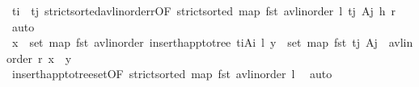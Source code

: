 \begin{isabellebody}
\ {\isacartoucheopen}t\isactrlsub i\ {\isacharless}{\kern0pt}\ t\isactrlsub j{\isacartoucheclose}\ strict{\isacharunderscore}{\kern0pt}sorted{\isacharunderscore}{\kern0pt}avl{\isacharunderscore}{\kern0pt}inorder{\isacharunderscore}{\kern0pt}r{\isacharbrackleft}{\kern0pt}OF\ {\isacartoucheopen}strict{\isacharunderscore}{\kern0pt}sorted\ {\isacharparenleft}{\kern0pt}map\ fst\ {\isacharparenleft}{\kern0pt}avl{\isacharunderscore}{\kern0pt}inorder\ {\isasymlangle}l{\isacharcomma}{\kern0pt}\ {\isacharparenleft}{\kern0pt}{\isacharparenleft}{\kern0pt}t\isactrlsub j{\isacharcomma}{\kern0pt}\ A\isactrlsub j{\isacharparenright}{\kern0pt}{\isacharcomma}{\kern0pt}\ h{\isacharparenright}{\kern0pt}{\isacharcomma}{\kern0pt}\ r{\isasymrangle}{\isacharparenright}{\kern0pt}{\isacharparenright}{\kern0pt}{\isacartoucheclose}{\isacharbrackright}{\kern0pt}\ \isamarkupfalse%
\ auto\isanewline
\ \ \ \ \ \ \isamarkupfalse%
\ \isamarkupfalse%
\ {\isachardoublequoteopen}{\isasymforall}x\ {\isasymin}\ set\ {\isacharparenleft}{\kern0pt}map\ fst\ {\isacharparenleft}{\kern0pt}avl{\isacharunderscore}{\kern0pt}inorder\ {\isacharparenleft}{\kern0pt}insert{\isacharunderscore}{\kern0pt}happ{\isacharunderscore}{\kern0pt}to{\isacharunderscore}{\kern0pt}tree\ {\isacharparenleft}{\kern0pt}t\isactrlsub i{\isacharcomma}{\kern0pt}A\isactrlsub i{\isacharparenright}{\kern0pt}\ l{\isacharparenright}{\kern0pt}{\isacharparenright}{\kern0pt}{\isacharparenright}{\kern0pt}{\isachardot}{\kern0pt}\ {\isasymforall}y\ {\isasymin}\ set\ {\isacharparenleft}{\kern0pt}map\ fst\ {\isacharparenleft}{\kern0pt}{\isacharparenleft}{\kern0pt}t\isactrlsub j{\isacharcomma}{\kern0pt}\ A\isactrlsub j{\isacharparenright}{\kern0pt}\ {\isacharhash}{\kern0pt}\ avl{\isacharunderscore}{\kern0pt}inorder\ r{\isacharparenright}{\kern0pt}{\isacharparenright}{\kern0pt}{\isachardot}{\kern0pt}\ x\ {\isacharless}{\kern0pt}\ y{\isachardoublequoteclose}\isanewline
\ \ \ \ \ \ \ \ \isamarkupfalse%
\ insert{\isacharunderscore}{\kern0pt}happ{\isacharunderscore}{\kern0pt}to{\isacharunderscore}{\kern0pt}tree{\isacharunderscore}{\kern0pt}set{\isacharbrackleft}{\kern0pt}OF\ {\isacartoucheopen}strict{\isacharunderscore}{\kern0pt}sorted\ {\isacharparenleft}{\kern0pt}map\ fst\ {\isacharparenleft}{\kern0pt}avl{\isacharunderscore}{\kern0pt}inorder\ l{\isacharparenright}{\kern0pt}{\isacharparenright}{\kern0pt}{\isacartoucheclose}{\isacharbrackright}{\kern0pt}\ \isamarkupfalse%
\ auto\isanewline
\ \ \ \ \ \ \isamarkupfalse%
\ \isamarkupfalse%

\end{isabellebody}
